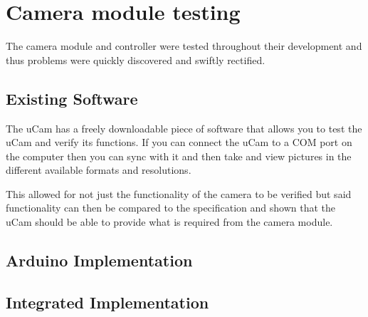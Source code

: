 \section{Camera module testing}

The camera module and controller were tested throughout their development and thus problems were quickly discovered and swiftly rectified.

\subsection{Existing Software}

The uCam has a freely downloadable piece of software that allows you to test the uCam and verify its functions. If you can connect the uCam to a COM port on the computer then you can sync with it and then take and view pictures in the different available formats and resolutions.

This allowed for not just the functionality of the camera to be verified but said functionality can then be compared to the specification and shown that the uCam should be able to provide what is required from the camera module.

\subsection{Arduino Implementation}



\subsection{Integrated Implementation}


